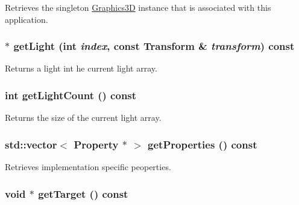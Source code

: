 Retrieves the singleton \hyperlink{classm3g_1_1Graphics3D}{Graphics3D} instance that is associated with this application. \hypertarget{classm3g_1_1Graphics3D_04272e584440c89fb4cb449003a84e7d}{
\subsubsection[{getLight}]{ $\ast$ getLight (int {\em index}, \/  const {\bf Transform} \& {\em transform}) const}}
\label{classm3g_1_1Graphics3D_04272e584440c89fb4cb449003a84e7d}


Returns a light int he current light array. \hypertarget{classm3g_1_1Graphics3D_7a08cfeb48d76ad5d8859a1fc0c77d98}{
\subsubsection[{getLightCount}]{\setlength{\rightskip}{0pt plus 5cm}int getLightCount () const}}
\label{classm3g_1_1Graphics3D_7a08cfeb48d76ad5d8859a1fc0c77d98}


Returns the size of the current light array. \hypertarget{classm3g_1_1Graphics3D_d87d3f8145ea47e2b736c6c3525dad5c}{
\subsubsection[{getProperties}]{\setlength{\rightskip}{0pt plus 5cm}std::vector$<$ Property $\ast$ $>$ getProperties () const}}
\label{classm3g_1_1Graphics3D_d87d3f8145ea47e2b736c6c3525dad5c}


Retrieves implementation specific peoperties. \hypertarget{classm3g_1_1Graphics3D_02d0033930c8e68f4d7ebd43abe7980a}{
\subsubsection[{getTarget}]{\setlength{\rightskip}{0pt plus 5cm}void $\ast$ getTarget () const}}
\label{classm3g_1_1Graphics3D_02d0033930c8e68f4d7ebd43abe7980a}


